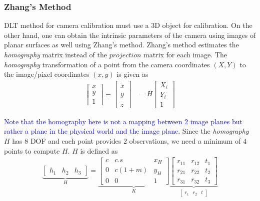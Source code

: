 \documentclass{report}
\begin{document}
\subsubsection{Zhang's Method}
\hspace{\parindent}DLT method for camera calibration must use a $3$D object for calibration. On the other hand, one can obtain the intrinsic parameters of the camera using images of planar surfaces as well using Zhang's method. Zhang's method estimates the \textit{homography} matrix instead of the $projection$ matrix for each image. The \textit{homography} transformation of a point from the camera coordinates $(X, Y)$ to the image/pixel coordinates $(x, y)$ is given as
\begin{align}
	\begin{bmatrix}
		x \\
		y \\
		1
	\end{bmatrix}
	\equiv
	\begin{bmatrix}
		\tilde{x} \\
		\tilde{y} \\
		\tilde{z}
	\end{bmatrix}
	&=
	H
	\begin{bmatrix}
		X_i \\
		Y_i \\
		1
	\end{bmatrix}
\end{align}

\textcolor{blue}{Note that the homography here is not a mapping between $2$ image planes but rather a plane in the physical world and the image plane.} Since the \textit{homography} $H$ has $8$ DOF and each point provides $2$ observations, we need a minimum of $4$ points to compute $H$. $H$ is defined as
\begin{align}
	\underbrace{\begin{bmatrix}
		h_1 & h_2 & h_3
	\end{bmatrix}}_{H}
	=
	\underbrace{\begin{bmatrix}
		c & c.s & x_H \\
		0 & c(1+m) & y_H \\
		0 & 0 & 1
	\end{bmatrix}}_{K}
	\underbrace{\begin{bmatrix}
		r_{11} & r_{12} & t_1 \\
		r_{21} & r_{22} & t_2 \\
		r_{31} & r_{32} & t_3
	\end{bmatrix}}_{\begin{bmatrix}
						r_1 & r_2 & t
					\end{bmatrix}}
	\label{eqn:HomographyZhang}
\end{align}
\end{document}
